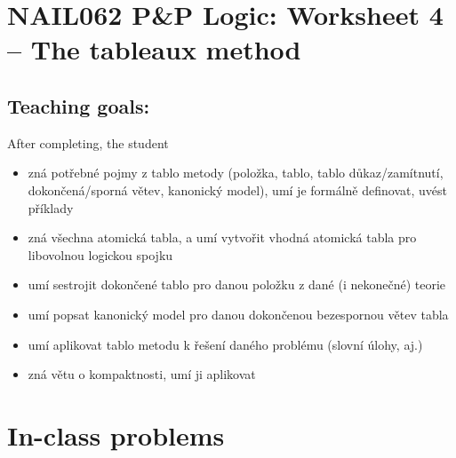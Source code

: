 \section*{NAIL062 P\&P Logic: Worksheet 4 -- The tableaux method}



\subsection*{Teaching goals:} After completing, the student

    \begin{itemize}\setlength{\itemsep}{0pt}
        \item zná potřebné pojmy z tablo metody (položka, tablo, tablo důkaz/zamítnutí, dokončená/sporná větev, kanonický model), umí je formálně definovat, uvést příklady
        \item zná všechna atomická tabla, a umí vytvořit vhodná atomická tabla pro libovolnou logickou spojku
        \item umí sestrojit dokončené tablo pro danou položku z dané (i nekonečné) teorie
        \item umí popsat kanonický model pro danou dokončenou bezespornou větev tabla
        \item umí aplikovat tablo metodu k řešení daného problému (slovní úlohy, aj.)
        \item zná větu o kompaktnosti, umí ji aplikovat
    \end{itemize}
    

\section*{In-class problems}


